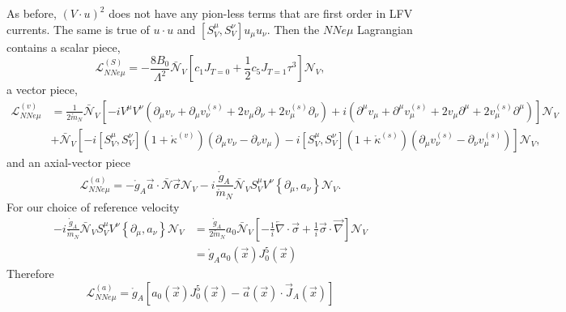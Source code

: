 \documentclass{book}[12pt]
\begin{document}
As before, $(V\cdot u)^2$ does not have any pion-less terms that are first order in LFV currents. The same is true of $u\cdot u$ and $\left[S^{\mu}_V,S^{\nu}_V\right]u_{\mu}u_{\nu}$. 
Then the $NNe\mu$ Lagrangian contains a scalar piece,
\begin{equation}
\mathcal{L}^{(S)}_{NN e\mu}=-\frac{8B_0}{\Lambda^2}\bar{\mathcal{N}}_V\left[c_1J_{T=0}+\frac{1}{2}c_5J_{T=1}\tau^3\right]\mathcal{N}_V,
\end{equation}
a vector piece,
\begin{equation}
\begin{split}
\mathcal{L}^{(v)}_{NN e\mu}&=\frac{1}{2\mathring{m}_N}\bar{\mathcal{N}}_V\left[-iV^{\mu}V^{\nu}\left(\partial_{\mu}v_{\nu}+\partial_{\mu}v_{\nu}^{(s)}+2v_{\mu}\partial_{\nu}+2v_{\mu}^{(s)}\partial_{\nu}\right)+i\left(\partial^{\mu}v_{\mu}+\partial^{\mu}v_{\mu}^{(s)}+2v_{\mu}\partial^{\mu}+2v_{\mu}^{(s)}\partial^{\mu}\right)\right]\mathcal{N}_V\\
&+\bar{\mathcal{N}}_V\left[-i\left[S_V^{\mu},S_V^{\nu}\right]\left(1+\mathring{\kappa}^{(v)}\right)\left(\partial_{\mu}v_{\nu}-\partial_{\nu}v_{\mu}\right)-i\left[S_V^{\mu},S_V^{\nu}\right]\left(1+\mathring{\kappa}^{(s)}\right)\left(\partial_{\mu}v_{\nu}^{(s)}-\partial_{\nu}v_{\mu}^{(s)}\right)\right]\mathcal{N}_V,
\end{split}
\end{equation}
and an axial-vector piece
\begin{equation}
\mathcal{L}^{(a)}_{NN e\mu}=-\mathring{g}_A\vec{a}\cdot\bar{\mathcal{N}}\vec{\sigma}\mathcal{N}_V-i\frac{\mathring{g}_A}{\mathring{m}_N}\bar{\mathcal{N}}_VS^{\mu}_VV^{\nu}\left\{\partial_{\mu},a_{\nu}\right\}\mathcal{N}_V.
\end{equation}
For our choice of reference velocity
\begin{equation}
\begin{split}
-i\frac{\mathring{g}_A}{\mathring{m}_N}\bar{\mathcal{N}}_VS_V^{\mu}V^{\nu}\left\{\partial_{\mu},a_{\nu}\right\}\mathcal{N}_V&=\frac{\mathring{g}_A}{2\mathring{m}_N}a_0\bar{\mathcal{N}}_V\left[-\frac{1}{i}\overleftarrow{\nabla}\cdot\vec{\sigma} + \frac{1}{i}\vec{\sigma}\cdot\overrightarrow{\nabla}\right]\mathcal{N}_V\\
&=
\mathring{g}_Aa_0(\vec{x}) J_0^5(\vec{x})
\end{split}
\end{equation}
Therefore
\begin{equation}
\mathcal{L}^{(a)}_{NNe\mu}=\mathring{g}_A\left[a_0(\vec{x})J_0^5(\vec{x})-\vec{a}(\vec{x})\cdot\vec{J}_A(\vec{x})\right]
\end{equation}
\end{document}
